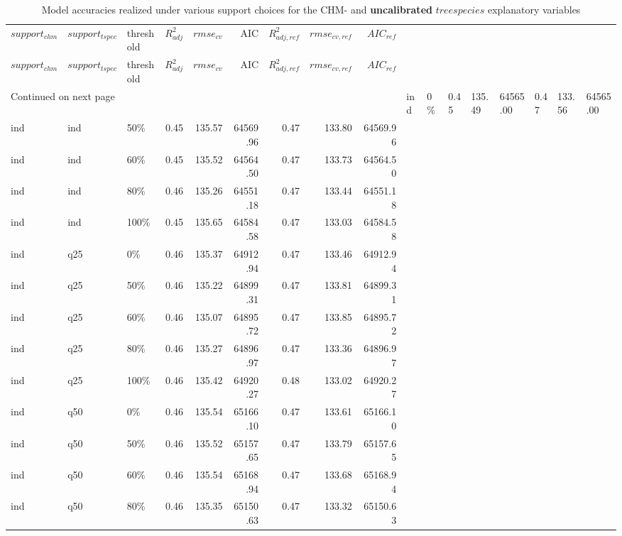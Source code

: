 \begingroup\fontsize{9pt}{10pt}\selectfont
\begin{longtable}{lllrrrrrr}
\caption{Model accuracies realized under various 
                       support choices for the CHM- and \textbf{uncalibrated} $treespecies$ 
                       explanatory variables}\\ \\
\hline
$support_{chm}$ & $support_{tspec}$ & threshold & $R^2_{adj}$ & $rmse_{cv}$ & AIC & $R^2_{adj, ref}$ & $rmse_{cv, ref}$ & $AIC_{ref}$ \\ 
  \hline
\endfirsthead
  \hline
$support_{chm}$ & $support_{tspec}$ & threshold & $R^2_{adj}$ & $rmse_{cv}$ & AIC & $R^2_{adj, ref}$ & $rmse_{cv, ref}$ & $AIC_{ref}$ \\ 
  \hline
\endhead
\hline
\multicolumn{9}{l}{\footnotesize Continued on next page}
\endfoot
\endlastfoot
ind & ind & 0\% & 0.45 & 135.49 & 64565.00 & 0.47 & 133.56 & 64565.00 \\ 
  ind & ind & 50\% & 0.45 & 135.57 & 64569.96 & 0.47 & 133.80 & 64569.96 \\ 
  ind & ind & 60\% & 0.45 & 135.52 & 64564.50 & 0.47 & 133.73 & 64564.50 \\ 
  ind & ind & 80\% & 0.46 & 135.26 & 64551.18 & 0.47 & 133.44 & 64551.18 \\ 
  ind & ind & 100\% & 0.45 & 135.65 & 64584.58 & 0.47 & 133.03 & 64584.58 \\ 
  ind & q25 & 0\% & 0.46 & 135.37 & 64912.94 & 0.47 & 133.46 & 64912.94 \\ 
  ind & q25 & 50\% & 0.46 & 135.22 & 64899.31 & 0.47 & 133.81 & 64899.31 \\ 
  ind & q25 & 60\% & 0.46 & 135.07 & 64895.72 & 0.47 & 133.85 & 64895.72 \\ 
  ind & q25 & 80\% & 0.46 & 135.27 & 64896.97 & 0.47 & 133.36 & 64896.97 \\ 
  ind & q25 & 100\% & 0.46 & 135.42 & 64920.27 & 0.48 & 133.02 & 64920.27 \\ 
  ind & q50 & 0\% & 0.46 & 135.54 & 65166.10 & 0.47 & 133.61 & 65166.10 \\ 
  ind & q50 & 50\% & 0.46 & 135.52 & 65157.65 & 0.47 & 133.79 & 65157.65 \\ 
  ind & q50 & 60\% & 0.46 & 135.54 & 65168.94 & 0.47 & 133.68 & 65168.94 \\ 
  ind & q50 & 80\% & 0.46 & 135.35 & 65150.63 & 0.47 & 133.32 & 65150.63 \\ 

\end{longtable}

